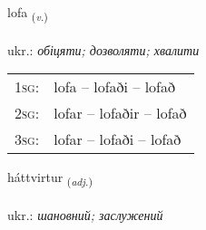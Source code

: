 \documentclass[frontgrid, backgrid]{flacards}\usepackage[]{graphicx}\usepackage[]{xcolor}
\begin{document}
\renewcommand{\flhead}{\vskip5pt \fboxsep=0pt {\small\bfseries\footnotesize Sagnorð | дієслово}}
\renewcommand{\fcfoot}{\vskip5pt \fboxsep=0pt \hspace{2pt}{\small\bfseries\footnotesize 2K}}

\renewcommand{\blhead}{\vskip5pt {\small\bfseries\footnotesize Sagnorð | дієслово }}
\renewcommand{\bcfoot}{\vskip5pt \hspace{2pt}{\small\bfseries\footnotesize 2K}}


{lofa \small{\textsubscript{(\textit{v.})}} \\[1ex] %
\textphonetic{[lɔːva]} \\
ukr.: \emph{обіцяти; дозволяти; хвалити} \\  [2ex]
\renewcommand*{\arraystretch}{0.8}
\begin{tabular}{p{1cm}l}
\textsc{1sg}: & lofa -- lofaði -- lofað \\ 
\textsc{2sg}: & lofar -- lofaðir -- lofað \\ 
\textsc{3sg}: & lofar -- lofaði -- lofað \\ 
\end{tabular}
}

\renewcommand{\flhead}{\vskip5pt \fboxsep=0pt {\small\bfseries\footnotesize Lýsingarorð | прикметник}}
\renewcommand{\fcfoot}{\vskip5pt \fboxsep=0pt \hspace{2pt}{\small\bfseries\footnotesize 2K}}

\renewcommand{\blhead}{\vskip5pt {\small\bfseries\footnotesize Lýsingarorð | прикметник }}
\renewcommand{\bcfoot}{\vskip5pt \hspace{2pt}{\small\bfseries\footnotesize 2K}}


{háttvirtur \small{\textsubscript{(\textit{adj.})}} \\[1ex] %
 \\
ukr.: \emph{шановний; заслужений} \\  [2ex]
\renewcommand*{\arraystretch}{0.8}
}
\end{document}
